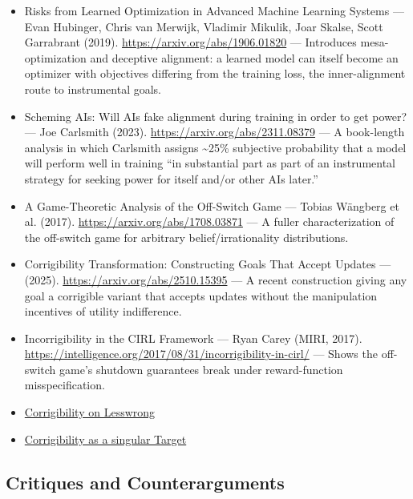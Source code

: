\documentclass[11pt]{article}
\begin{document}
\begin{itemize}
  \item Risks from Learned Optimization in Advanced Machine Learning Systems --- Evan Hubinger, Chris van Merwijk, Vladimir Mikulik, Joar Skalse, Scott Garrabrant (2019). \href{https://arxiv.org/abs/1906.01820}{https://arxiv.org/abs/1906.01820} --- Introduces mesa-optimization and deceptive alignment: a learned model can itself become an optimizer with objectives differing from the training loss, the inner-alignment route to instrumental goals.
  \item Scheming AIs: Will AIs fake alignment during training in order to get power? --- Joe Carlsmith (2023). \href{https://arxiv.org/abs/2311.08379}{https://arxiv.org/abs/2311.08379} --- A book-length analysis in which Carlsmith assigns \textasciitilde{}25\% subjective probability that a model will perform well in training ``in substantial part as part of an instrumental strategy for seeking power for itself and/or other AIs later.''
  \item A Game-Theoretic Analysis of the Off-Switch Game --- Tobias Wängberg et al. (2017). \href{https://arxiv.org/abs/1708.03871}{https://arxiv.org/abs/1708.03871} --- A fuller characterization of the off-switch game for arbitrary belief/irrationality distributions.
  \item Corrigibility Transformation: Constructing Goals That Accept Updates --- (2025). \href{https://arxiv.org/abs/2510.15395}{https://arxiv.org/abs/2510.15395} --- A recent construction giving any goal a corrigible variant that accepts updates without the manipulation incentives of utility indifference.
  \item Incorrigibility in the CIRL Framework --- Ryan Carey (MIRI, 2017). \href{https://intelligence.org/2017/08/31/incorrigibility-in-cirl/}{https://intelligence.org/2017/08/31/incorrigibility-in-cirl/} --- Shows the off-switch game's shutdown guarantees break under reward-function misspecification.
  \item \href{https://www.lesswrong.com/w/corrigibility-1}{Corrigibility on Lesswrong}
  \item \href{https://www.lesswrong.com/s/KfCjeconYRdFbMxsy/p/NQK8KHSrZRF5erTba}{Corrigibility as a singular Target}
\end{itemize}

\subsection*{Critiques and Counterarguments}
\end{document}
